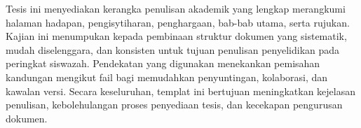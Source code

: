 \begin{abstrak}
Tesis ini menyediakan kerangka penulisan akademik yang lengkap merangkumi
halaman hadapan, pengisytiharan, penghargaan, bab-bab utama, serta rujukan.
Kajian ini menumpukan kepada pembinaan struktur dokumen yang sistematik, mudah
diselenggara, dan konsisten untuk tujuan penulisan penyelidikan pada peringkat
siswazah. Pendekatan yang digunakan menekankan pemisahan kandungan mengikut fail
bagi memudahkan penyuntingan, kolaborasi, dan kawalan versi. Secara
keseluruhan, templat ini bertujuan meningkatkan kejelasan penulisan,
kebolehulangan proses penyediaan tesis, dan kecekapan pengurusan dokumen.

\end{abstrak}

